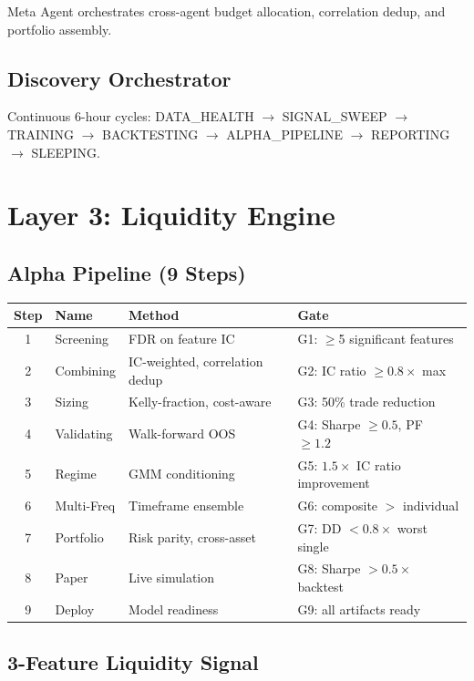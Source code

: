 \documentclass[11pt,a4paper]{article}
\begin{document}
Meta Agent orchestrates cross-agent budget allocation, correlation dedup, and portfolio assembly.

\subsection{Discovery Orchestrator}

Continuous 6-hour cycles: DATA\_HEALTH $\to$ SIGNAL\_SWEEP $\to$ TRAINING $\to$ BACKTESTING $\to$ ALPHA\_PIPELINE $\to$ REPORTING $\to$ SLEEPING.

\section{Layer 3: Liquidity Engine}

\subsection{Alpha Pipeline (9 Steps)}

\begin{longtable}{|c|l|l|l|}
\hline
\textbf{Step} & \textbf{Name} & \textbf{Method} & \textbf{Gate} \\
\hline
1 & Screening & FDR on feature IC & G1: $\geq$5 significant features \\
2 & Combining & IC-weighted, correlation dedup & G2: IC ratio $\geq 0.8\times$ max \\
3 & Sizing & Kelly-fraction, cost-aware & G3: 50\% trade reduction \\
4 & Validating & Walk-forward OOS & G4: Sharpe $\geq 0.5$, PF $\geq 1.2$ \\
5 & Regime & GMM conditioning & G5: $1.5\times$ IC ratio improvement \\
6 & Multi-Freq & Timeframe ensemble & G6: composite $>$ individual \\
7 & Portfolio & Risk parity, cross-asset & G7: DD $< 0.8\times$ worst single \\
8 & Paper & Live simulation & G8: Sharpe $> 0.5\times$ backtest \\
9 & Deploy & Model readiness & G9: all artifacts ready \\
\hline
\end{longtable}

\subsection{3-Feature Liquidity Signal}
\end{document}
